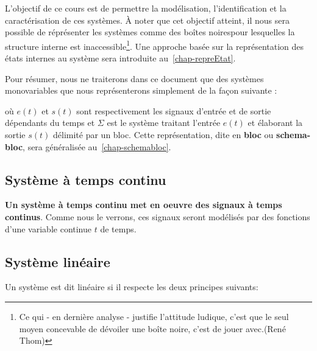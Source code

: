 L'objectif de ce cours est de permettre la modélisation, 
l'identification et la caractérisation de ces systèmes. 
\`A noter que cet objectif atteint, il nous sera possible de réprésenter les systèmes 
comme des \og boîtes noires\fg pour lesquelles la structure interne est 
inaccessible\footnote{\og Ce qui - en dernière analyse - justifie l'attitude 
ludique, c'est que le seul moyen concevable de dévoiler une boîte noire, 
c'est de jouer avec.\fg (René Thom)}. Une approche basée sur la représentation
des états internes au système sera introduite au~\cref{chap-repreEtat}. 

Pour résumer, nous ne traiterons dans ce document 
que des systèmes monovariables que 
nous représenterons simplement de la façon suivante :
\begin{center}
\end{center}
où $e(t)$ et $s(t)$ sont respectivement les signaux d'entrée et de sortie 
dépendants du temps et $\Sigma$ est le système traitant l'entrée $e(t)$ et élaborant
la sortie $s(t)$ délimité par un bloc. 
Cette représentation, dite en \textbf{bloc} ou 
\textbf{schema-bloc}, sera généralisée au~\cref{chap-schemabloc}.

\subsection{Système à temps continu}
\textbf{Un système à temps continu met en oeuvre des signaux 
à temps continus}. Comme nous le verrons, ces signaux seront
modélisés par des fonctions d'une variable continue $t$ de temps.

\subsection{Système linéaire}

Un système est dit linéaire si il respecte les deux principes suivants:

